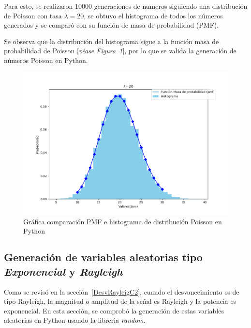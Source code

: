 Para esto, se realizaron $10000$ generaciones de numeros siguiendo una distribución de Poisson con tasa $\lambda = 20$, se obtuvo el histograma de todos los números generados y se comparó con su función de masa de probabilidad (PMF).\newline

Se observa que la distribución del histograma sigue a la función masa de probabilidad de Poisson [\textit{véase Figura~\ref{fig:generacionPoisson}}], por lo que se valida la generación de números Poisson en Python.\newline

\begin{figure}[th]
    \centering
    \includegraphics[scale=.5]{Figures/PoissonDistribution}
    \decoRule
    \caption[Gráfica comparación PMF e histograma de distribución Poisson en Python]{Gráfica comparación PMF e histograma de distribución Poisson en Python}
    \label{fig:generacionPoisson}
\end{figure}
\break

\subsection{Generación de variables aleatorias tipo \textit{Exponencial} y \textit{Rayleigh}}

Como se revisó en la sección~\ref{DesvRayleigC2}, cuando el desvanecimiento es de tipo Rayleigh, la magnitud o amplitud de la señal es Rayleigh y la potencia es exponencial. En esta sección, se comprobó la generación de estas variables aleatorias en Python usando la libreria \textit{random}.\newline


